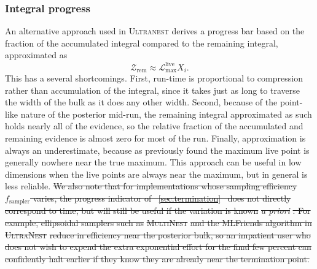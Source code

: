 \documentclass[usenatbib]{mnras}
\newcommand{\Like}{\mathcal{L}}
\providecommand{\DIFaddtex}[1]{{\protect\color{blue}\uwave{#1}}} %
\providecommand{\DIFdeltex}[1]{{\protect\color{red}\sout{#1}}}                      %
\providecommand{\DIFaddbegin}{} %
\providecommand{\DIFaddend}{} %
\providecommand{\DIFdelbegin}{} %
\providecommand{\DIFdelend}{} %
\providecommand{\DIFadd}[1]{\texorpdfstring{\DIFaddtex{#1}}{#1}} %
\providecommand{\DIFdel}[1]{\texorpdfstring{\DIFdeltex{#1}}{}} %
\newcommand{\DIFscaledelfig}{0.5}
\newlength{\DIFdelgraphicswidth} %
\newlength{\DIFdelgraphicsheight} %
\newcommand{\DIFaddincludegraphics}[2][]{{\color{blue}\fbox{\DIFOincludegraphics[#1]{#2}}}} %
\newcommand{\DIFdelincludegraphics}[2][]{%
\sbox{\DIFdelgraphicsbox}{\DIFOincludegraphics[#1]{#2}}%
\settoboxwidth{\DIFdelgraphicswidth}{\DIFdelgraphicsbox} %
\settoboxtotalheight{\DIFdelgraphicsheight}{\DIFdelgraphicsbox} %
\scalebox{\DIFscaledelfig}{%
\parbox[b]{\DIFdelgraphicswidth}{\usebox{\DIFdelgraphicsbox}\\[-\baselineskip] \rule{\DIFdelgraphicswidth}{0em}}\llap{\resizebox{\DIFdelgraphicswidth}{\DIFdelgraphicsheight}{%
\setlength{\unitlength}{\DIFdelgraphicswidth}%
\begin{picture}(1,1)%
\thicklines\linethickness{2pt} %
{\color[rgb]{1,0,0}\put(0,0){\framebox(1,1){}}}%
{\color[rgb]{1,0,0}\put(0,0){\line( 1,1){1}}}%
{\color[rgb]{1,0,0}\put(0,1){\line(1,-1){1}}}%
\end{picture}%
}\hspace*{3pt}}} %
} %
\DeclareRobustCommand{\DIFaddbegin}{\DIFOaddbegin \let\includegraphics\DIFaddincludegraphics} %
\DeclareRobustCommand{\DIFaddend}{\DIFOaddend \let\includegraphics\DIFOincludegraphics} %
\DeclareRobustCommand{\DIFdelbegin}{\DIFOdelbegin \let\includegraphics\DIFdelincludegraphics} %
\DeclareRobustCommand{\DIFdelend}{\DIFOaddend \let\includegraphics\DIFOincludegraphics} %
\begin{document}
\subsubsection{Integral progress}
An alternative approach used in \textsc{Ultranest} \citep{ultranest} derives a progress bar based on the fraction of the accumulated integral compared to the remaining integral, approximated as 
\begin{equation}\label{eq:integral_progress}
    \mathcal{Z}_\mathrm{rem} \approx \Like_\mathrm{max}^{\mathrm{live}} X_i.
\end{equation}
This has a several shortcomings. First, run-time is proportional to compression rather than accumulation of the integral, since it takes just as long to traverse the width of the bulk as it does any other width. Second, because of the point-like nature of the posterior mid-run, the remaining integral approximated as such holds nearly all of the evidence, so the relative fraction of the accumulated and remaining evidence is almost zero for most of the run. Finally, approximation \DIFdelbegin %
\DIFdelend \DIFaddbegin \DIFadd{\mbox{%
\cref{eq:integral_progress} }\hspace{0pt}%
}\DIFaddend is always an underestimate, because as previously found the maximum live point is generally nowhere near the true maximum. This approach can be useful in low dimensions when the live points are always near the maximum, but in general is less reliable.
\DIFdelbegin %
\DIFdel{We also note that for implementations whose sampling efficiency $f_\mathrm{sampler}$ varies, the progress indicator of \mbox{%
\cref{sec:termination} }\hspace{0pt}%
does not directly correspond to time, but will still be useful if the variation is known }\textit{\DIFdel{a priori}}%
\DIFdel{. For example, ellipsoidal samplers such as }\textsc{\DIFdel{MultiNest}} %
\DIFdel{and the MLFriends algorithm in }\textsc{\DIFdel{UltraNest}} %
\DIFdel{reduce in efficiency near the posterior bulk, so an impatient user who does not wish to expend the extra exponential effort for the final few percent can confidently halt earlier if they know they are already near the termination point.
}\DIFdelend 
\end{document}

